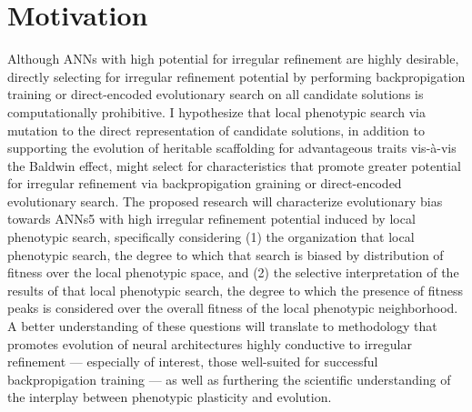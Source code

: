 \section{Motivation}

Although ANNs with high potential for irregular refinement are highly desirable, directly selecting for irregular refinement potential by performing backpropigation training or direct-encoded evolutionary search on all candidate solutions is computationally prohibitive.
I hypothesize that local phenotypic search via mutation to the direct representation of candidate solutions, in addition to supporting the evolution of heritable scaffolding for advantageous traits vis-\`{a}-vis the Baldwin effect, might select for characteristics that promote greater potential for irregular refinement via backpropigation graining or direct-encoded evolutionary search.
The proposed research will characterize evolutionary bias towards ANNs5 with high irregular refinement potential induced by local phenotypic search, specifically considering (1) the organization that local phenotypic search, the degree to which that search is biased by distribution of fitness over the local phenotypic space, and (2) the selective interpretation of the results of that local phenotypic search, the degree to which the presence of fitness peaks is considered over the overall fitness of the local phenotypic neighborhood.
A better understanding of these questions will translate to methodology that promotes evolution of neural architectures highly conductive to irregular refinement --- especially of interest, those well-suited for successful backpropigation training --- as well as furthering the scientific understanding of the interplay between phenotypic plasticity and evolution.
